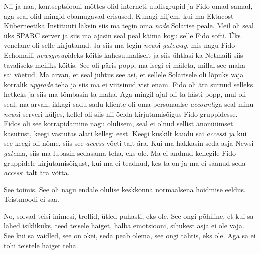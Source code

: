 Nii ja naa, kontseptsiooni mõttes olid interneti uudisgrupid ja Fido omad 
samad, aga seal olid mingid ebamugavad erisused. Kunagi  hiljem, kui ma 
Ektacost Küberneetika Instituuti läksin siis ma tegin oma 
\emph{node} Solarise peale. Meil oli seal üks 
SPARC server ja siis ma ajasin seal peal käima kogu selle Fido softi. Üks 
venelane oli selle kirjutanud. Ja siis ma tegin \emph{news}i \emph{gateway}, 
mis nagu Fido Echomaili \emph{newsgroup}ideks köitis kahesuunaliselt ja siis 
ühtlasi ka Netmaili siis tavaliseks meiliks köitis. See oli päris popp, ma 
isegi ei mäleta, millal see maha sai võetud. Ma arvan, et seal juhtus see asi, 
et sellele Solarisele oli lõpuks vaja  korralik \emph{upgrade} teha ja siis ma 
ei viitsinud vist enam. Fido oli ära surnud selleks hetkeks ja siis ma tõmbasin 
ta maha. Aga mingil ajal  oli ta hästi popp, mul oli seal, ma arvan, ikkagi 
sadu sadu kliente oli oma personaalse \emph{account}iga seal minu \emph{news}i 
serveri küljes, kellel oli siis nii-öelda kirjutamisõigus Fido gruppidesse. 
Fidos oli see korrapidamine nagu olulisem, seal ei olnud sellist anonüümset 
kasutust, keegi vastutas alati kellegi eest. Keegi  kuskilt kaudu sai 
\emph{access}i ja kui see keegi oli nõme, siis see \emph{access} võeti talt 
ära. Kui ma hakkasin seda asja Newsi \emph{gate}ma, siis ma lubasin sedasama 
teha, eks ole. Ma ei andnud kellegile Fido gruppidele  kirjutamisõigust, kui ma 
ei teadnud, kes ta on ja ma ei saanud seda \emph{access}i talt ära võtta. 


See toimis. See oli nagu  endale olulise keskkonna  normaalsena hoidmise 
eeldus. Teistmoodi ei saa. 


No, solvad teisi inimesi, trollid, ütled puhasti, eks ole. See ongi põhiline, 
et kui sa lähed isiklikuks, teed teisele haiget, halba emotsiooni, sihukest 
asja ei ole vaja. See kui sa vaidled, see on okei, seda peab olema, see ongi 
tähtis, eks ole. Aga sa ei tohi  teistele haiget teha. 


